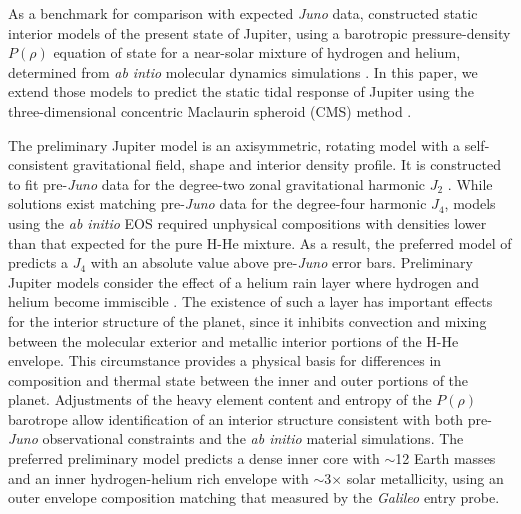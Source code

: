 As a benchmark for comparison with expected \textit{Juno} data, \citet{hubbard2016}
constructed static interior models of the present state of Jupiter, using a
barotropic pressure-density $P(\rho)$ equation of state for a near-solar mixture of
hydrogen and helium, determined from \textit{ab intio} molecular dynamics simulations
\citep{militzer2013a,militzer2013b}. In this paper, we extend those models to predict
the static tidal response of Jupiter using the three-dimensional concentric Maclaurin
spheroid (CMS) method \citep{wahl2016}.

The \citet{hubbard2016} preliminary Jupiter model is an axisymmetric, rotating model
with a self-consistent gravitational field, shape and interior density profile. It is
constructed to fit pre-\textit{Juno} data for the degree-two zonal gravitational
harmonic $J_2$ \citep{jacobson2003}. While solutions exist matching pre-\textit{Juno}
data for the degree-four harmonic $J_4$, models using the \textit{ab initio} EOS required unphysical
compositions with densities lower than that expected for the pure H-He mixture. As a result, the
preferred model of \citet{hubbard2016} predicts a $J_4$ with an absolute value above
pre-\textit{Juno} error bars. Preliminary Jupiter models consider the effect of a
helium rain layer where hydrogen and helium become immiscible \citep{stevenson1977a}.
The existence of such a layer has important effects for the interior structure of the
planet, since it inhibits convection and mixing between the molecular exterior and
metallic interior portions of the H-He envelope. This circumstance provides a
physical basis for differences in composition and thermal state between the inner and
outer portions of the planet.  Adjustments of the heavy element content and entropy
of the $P(\rho)$ barotrope allow identification of an interior structure consistent
with both pre-\textit{Juno} observational constraints and the \textit{ab initio}
material simulations. The preferred preliminary model predicts a dense inner core
with $\sim$12 Earth masses and an inner hydrogen-helium rich envelope with
$\sim$3$\times$ solar metallicity, using an outer envelope composition matching that
measured by the \textit{Galileo} entry probe.

